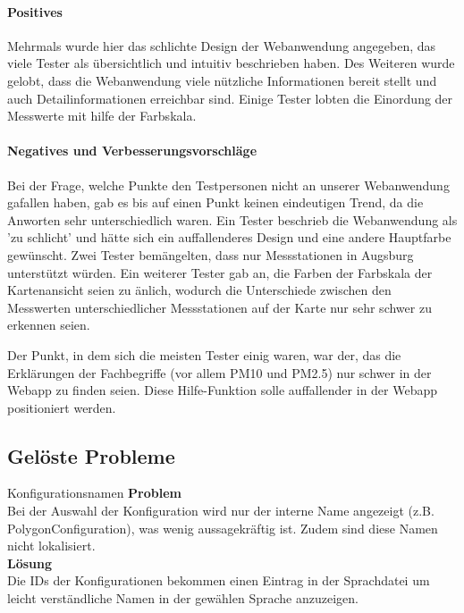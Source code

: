       \paragraph{Positives}
        Mehrmals wurde hier das schlichte Design der Webanwendung angegeben, das viele Tester als übersichtlich und intuitiv beschrieben haben.
        Des Weiteren wurde gelobt, dass die Webanwendung viele nützliche Informationen bereit stellt und auch Detailinformationen erreichbar sind.
        Einige Tester lobten die Einordung der Messwerte mit hilfe der Farbskala.
     
      \paragraph{Negatives und Verbesserungsvorschläge}
        Bei der Frage, welche Punkte den Testpersonen nicht an unserer Webanwendung gafallen haben, gab es bis auf einen Punkt keinen eindeutigen Trend, da die Anworten sehr unterschiedlich waren.
        Ein Tester beschrieb die Webanwendung als 'zu schlicht' und hätte sich ein auffallenderes Design und eine andere Hauptfarbe gewünscht.
        Zwei Tester bemängelten, dass nur Messstationen in Augsburg unterstützt würden.
        Ein weiterer Tester gab an, die Farben der Farbskala der Kartenansicht seien zu änlich, wodurch die Unterschiede zwischen den Messwerten unterschiedlicher Messstationen auf der Karte nur sehr schwer zu erkennen seien.
        
        Der Punkt, in dem sich die meisten Tester einig waren, war der, das die Erklärungen der Fachbegriffe (vor allem PM10 und PM2.5) nur schwer in der Webapp zu finden seien. Diese Hilfe-Funktion solle auffallender in der Webapp positioniert werden.

  \subsection{Gelöste Probleme}

    \begin{Bug}{Konfigurationsnamen}
      \textbf{Problem}\\
      Bei der Auswahl der Konfiguration wird nur der interne Name angezeigt (z.B. PolygonConfiguration),
      was wenig aussagekräftig ist. Zudem sind diese Namen nicht lokalisiert.\\
      \linebreak
      \textbf{Lösung}\\
      Die IDs der Konfigurationen bekommen einen Eintrag in der Sprachdatei um leicht verständliche
      Namen in der gewählen Sprache anzuzeigen.\\
    \end{Bug}

